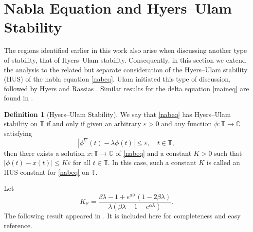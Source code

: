 \documentclass[12pt,reqno]{amsart}
\theoremstyle{plain}
\theoremstyle{definition}
\newtheorem{definition}[theorem]{Definition}
\newcommand{\R}{\ensuremath{\mathbb{R}}}
\newcommand{\T}{\ensuremath{\mathbb{T}}}
\newcommand{\C}{\ensuremath{\mathbb{C}}}
\numberwithin{equation}{section}
\numberwithin{theorem}{section}
\begin{document}

\section{Nabla Equation and Hyers--Ulam Stability}

The regions identified earlier in this work also arise when discussing another type of stability, that of Hyers--Ulam stability. Consequently, in this section we extend the analysis to the related but separate consideration of the Hyers--Ulam stability (HUS) of the nabla equation \eqref{nabeq}. Ulam \cite{ulam} initiated this type of discussion, followed by Hyers \cite{hyers} and Rassias \cite{rassias}. Similar results for the delta equation \eqref{maineq} are found in \cite{and}.

\begin{definition}[Hyers--Ulam Stability]
We say that \eqref{nabeq} has Hyers--Ulam stability on $\T$ if and only if given an arbitrary $\varepsilon>0$ and any function $\phi:\T\rightarrow\C$ satisfying 
\begin{equation}\label{phiineq}
 |\phi^\nabla(t)-\lambda\phi(t)|\le\varepsilon,  \quad t\in\T, 
\end{equation}
then there exists a solution $x:\T\rightarrow\C$ of \eqref{nabeq} and a constant $K>0$ such that $|\phi(t)-x(t)|\le K\varepsilon$ for all $t\in\T$. In this case, such a constant $K$ is called an HUS constant for \eqref{nabeq} on $\T$.
\end{definition}

Let
\begin{equation}\label{Krealnab}
 \widehat{K}_{\R}=\frac{\beta\lambda-1+e^{\alpha\lambda}(1-2\beta\lambda)}{\lambda\left(\beta\lambda-1-e^{\alpha\lambda}\right)}.
\end{equation}
The following result appeared in \cite[Theorem 2.5]{and}. It is included here for completeness and easy reference.

\end{document}
